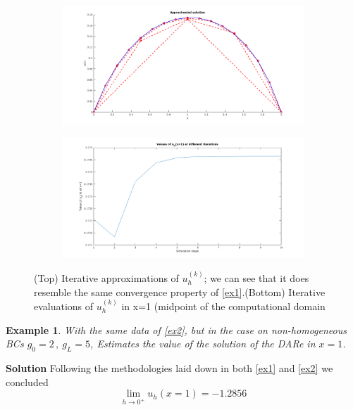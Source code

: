 \documentclass[12pt,openany,twoside,a4paper]{article}
\newtheorem{exmp}{Example}
\begin{document}
\begin{figure}[H]
    \begin{subfigure}[H]{0.75\textwidth}
        \includegraphics[keepaspectratio,width=1.25\textwidth]{ex2_1.png}
    \end{subfigure}
     \newline
     \begin{subfigure}[H]{0.75\textwidth}
        \includegraphics[keepaspectratio,width=\textwidth]{ex2_2.png}
    \end{subfigure}
     \captionsetup{singlelinecheck=off}
     \caption{(Top) Iterative approximations of $u_h^{(k)}$; we can see that it does resemble the same convergence property of \ref{ex1}.\newline(Bottom) Iterative evaluations of $u_h^{(k)}$ in x=1 (midpoint of the computational domain}
\end{figure}
\newpage
\begin{exmp}\label{ex3}
With the same data of \ref{ex2}, but in the case on non-homogeneous BCs $g_0=2\,,\:g_L=5$, Estimates the value of the solution of the DARe in $x=1$.
\end{exmp}
\textbf{Solution}
\newline Following the methodologies laid down in both \ref{ex1} and \ref{ex2} we concluded 
\begin{equation*}
    \lim_{h\to0^+}u_h(x=1)=-1.2856
\end{equation*}
\end{document}
